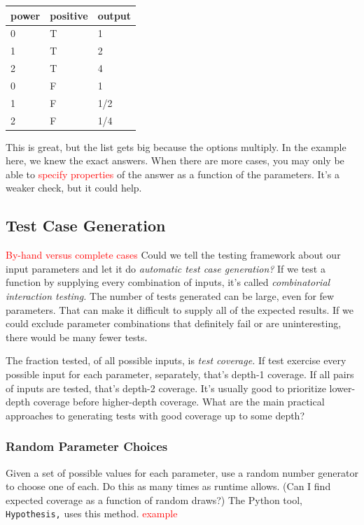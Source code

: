 \documentclass[fleqn,10pt]{olplainarticle}
\newcommand{\aside}[1]{\textcolor{red}{#1}}
\begin{document}
\begin{center}
\begin{tabular}{|l|l|l|}\hline
power & positive &output \\ \hline
0 & T & 1 \\
1 & T & 2 \\
2 & T & 4 \\
0 & F & 1 \\
1 & F & 1/2 \\
2 & F & 1/4 \\ \hline
\end{tabular}
\end{center}

This is great, but the list gets big because the options multiply.
In the example here, we knew the exact answers.
When there are more cases, you may only be able to \aside{specify properties} of the
answer as a function of the parameters. It's a weaker check,
but it could help.

\subsection{Test Case Generation}
\aside{By-hand versus complete cases}
Could we tell the testing framework about our input parameters
and let it do \emph{automatic test case generation?}
If we test a function by supplying every combination of inputs,
it's called \emph{combinatorial interaction testing.}
The number of tests generated can be large, even for few parameters.
That can make it difficult to supply all of the expected results.
If we could exclude parameter combinations that definitely fail
or are uninteresting, there would be many fewer tests.

The fraction tested, of all possible inputs, is \emph{test coverage.}
If test exercise every possible input for each parameter, separately,
that's depth-1 coverage. If all pairs of inputs are tested, that's
depth-2 coverage. It's usually good to prioritize lower-depth coverage
before higher-depth coverage. What are the main practical
approaches to generating tests with good coverage up to some depth?

\subsubsection{Random Parameter Choices}
Given a set of possible values for each parameter, use a random
number generator to choose one of each. Do this as many times
as runtime allows. (Can I find expected coverage as a function of
random draws?) The Python tool, \texttt{Hypothesis,} uses this
method. \aside{example}
\end{document}

